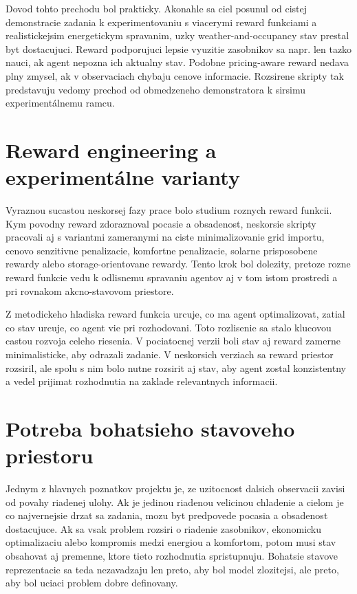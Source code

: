 \documentclass[conference]{IEEEtran}
\begin{document}
Dovod tohto prechodu bol prakticky. Akonahle sa ciel posunul od cistej demonstracie zadania k experimentovaniu s viacerymi reward funkciami a realistickejsim energetickym spravanim, uzky weather-and-occupancy stav prestal byt dostacujuci. Reward podporujuci lepsie vyuzitie zasobnikov sa napr. len tazko nauci, ak agent nepozna ich aktualny stav. Podobne pricing-aware reward nedava plny zmysel, ak v observaciach chybaju cenove informacie. Rozsirene skripty tak predstavuju vedomy prechod od obmedzeneho demonstratora k sirsimu experimentálnemu ramcu.

\section{Reward engineering a experimentálne varianty}
Vyraznou sucastou neskorsej fazy prace bolo studium roznych reward funkcii. Kym povodny reward zdoraznoval pocasie a obsadenost, neskorsie skripty pracovali aj s variantmi zameranymi na ciste minimalizovanie grid importu, cenovo senzitivne penalizacie, komfortne penalizacie, solarne prisposobene rewardy alebo storage-orientovane rewardy. Tento krok bol dolezity, pretoze rozne reward funkcie vedu k odlisnemu spravaniu agentov aj v tom istom prostredi a pri rovnakom akcno-stavovom priestore.

Z metodickeho hladiska reward funkcia urcuje, co ma agent optimalizovat, zatial co stav urcuje, co agent vie pri rozhodovani. Toto rozlisenie sa stalo klucovou castou rozvoja celeho riesenia. V pociatocnej verzii boli stav aj reward zamerne minimalisticke, aby odrazali zadanie. V neskorsich verziach sa reward priestor rozsiril, ale spolu s nim bolo nutne rozsirit aj stav, aby agent zostal konzistentny a vedel prijimat rozhodnutia na zaklade relevantnych informacii.

\section{Potreba bohatsieho stavoveho priestoru}
Jednym z hlavnych poznatkov projektu je, ze uzitocnost dalsich observacii zavisi od povahy riadenej ulohy. Ak je jedinou riadenou velicinou chladenie a cielom je co najvernejsie drzat sa zadania, mozu byt predpovede pocasia a obsadenost dostacujuce. Ak sa vsak problem rozsiri o riadenie zasobnikov, ekonomicku optimalizaciu alebo kompromis medzi energiou a komfortom, potom musi stav obsahovat aj premenne, ktore tieto rozhodnutia spristupnuju. Bohatsie stavove reprezentacie sa teda nezavadzaju len preto, aby bol model zlozitejsi, ale preto, aby bol uciaci problem dobre definovany.
\end{document}
